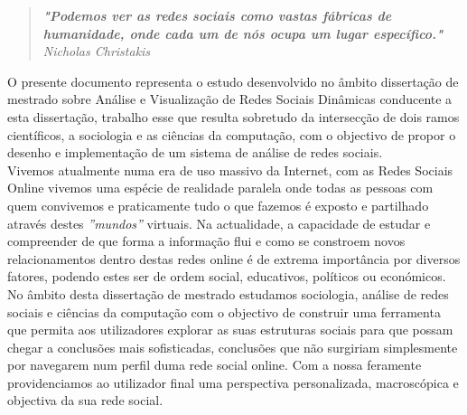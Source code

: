 
\begin{quote}
\textit{\textbf{"Podemos ver as redes sociais como vastas fábricas de humanidade, onde cada um de nós ocupa um lugar específico."} Nicholas Christakis}
\end{quote}

O presente documento representa o estudo desenvolvido no âmbito dissertação de mestrado sobre Análise e Visualização de Redes Sociais Dinâmicas conducente a esta dissertação, trabalho esse que resulta sobretudo da intersecção de dois ramos científicos, a sociologia e as ciências da computação, com o objectivo de propor o desenho e implementação de um sistema de análise de redes sociais.\\

Vivemos atualmente numa era de uso massivo da Internet, com as Redes Sociais Online vivemos uma espécie de realidade paralela onde todas as pessoas com quem convivemos e praticamente tudo o que fazemos é exposto e partilhado através destes \textit{''mundos''} virtuais. Na actualidade, a capacidade de estudar e compreender de que forma a informação flui e como se constroem novos relacionamentos dentro destas redes online é de extrema importância por diversos fatores, podendo estes ser de ordem social, educativos, políticos ou económicos. No âmbito desta dissertação de mestrado estudamos sociologia, análise de redes sociais e ciências da computação com o objectivo de construir uma ferramenta que permita aos utilizadores explorar as suas estruturas sociais para que possam chegar a conclusões mais sofisticadas, conclusões que não surgiriam simplesmente por navegarem num perfil duma rede social online. Com a nossa feramente providenciamos ao utilizador final uma perspectiva personalizada, macroscópica e objectiva da sua rede social.